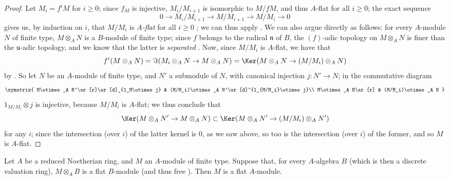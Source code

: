 \begin{proof}
Let $M_i=f^iM$ for $i\geq0$;
since $f_M$ is injective, $M_i/M_{i+1}$ is isomorphic to $M/fM$, and thus $A$-flat for all $i\geq0$;
the exact sequence
\[
  0\to M_i/M_{i+1}\to M/M_{i+1}\to M/M_i\to 0
\]
gives us, by induction on $i$, that $M/M_i$ is \emph{$A$-flat} for all $i\geq0$ ;
we can thus apply .
We can also argue directly as follows:
for every $A$-module $N$ of finite type, $M\otimes_A N$ is a $B$-module of finite type;
since $f$ belongs to the radical $\mathfrak{n}$ of $B$, the $(f)$-adic topology on $M\otimes_A N$ is finer than the
$\mathfrak{u}$-adic topology, and we know that the latter is \emph{separated} .
Now, since $M/M_i$ is $A$-flat, we have that
\[
  f^i(M\otimes_A N)=\Im(M_i\otimes_A N\to M\otimes_A N)=\Ker(M\otimes_A N\to(M/M_i)\otimes_A N)
\]
by .
So let $N$ be an $A$-module of finite type, and $N'$ a submodule of $N$, with canonical injection $j:N'\to N$; in the commutative diagram
\[
  \xymatrix{
    M\otimes_A N'\ar[r]\ar[d]_{1_M\otimes j} &
    (M/M_i)\otimes_A N'\ar[d]^{1_{M/M_i}\otimes j}\\
    M\otimes_A N\ar[r] &
    (M/M_i)\otimes_A N
  }
\]
$1_{M/M_i}\otimes j$ is injective, because $M/M_i$ is $A$-flat; we thus conclude that
\[
  \Ker(M\otimes_A N'\to M\otimes_A N)\subset\Ker(M\otimes_A N'\to(M/M_i)\otimes_A N')
\]
for any $i$; since the intersection (over $i$) of the latter kernel is $0$, as we saw above, so too is the intersection (over $i$) of the former, and so $M$ is $A$-flat.
\end{proof}

\begin{proposition}[10.2.8]
\label{0.10.2.8}
Let $A$ be a reduced Noetherian ring, and $M$ an $A$-module of finite type.
Suppose that, for every $A$-algebra $B$ (which is then a discrete valuation ring), $M\otimes_A B$ is a flat $B$-module (and thus free ).
Then $M$ is a flat $A$-module.
\end{proposition}

